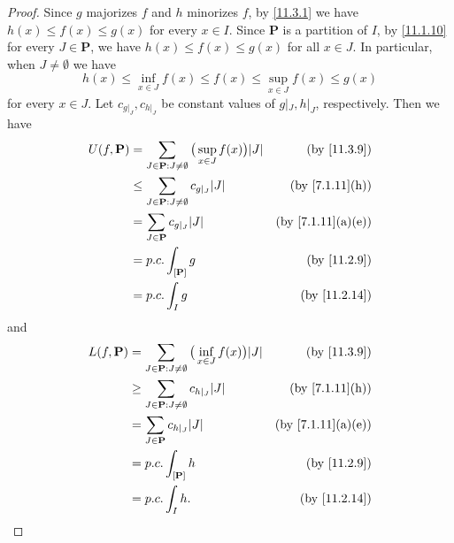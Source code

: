 \begin{proof}
  Since \(g\) majorizes \(f\) and \(h\) minorizes \(f\), by \cref{11.3.1} we have \(h(x) \leq f(x) \leq g(x)\) for every \(x \in I\).
  Since \(\mathbf{P}\) is a partition of \(I\), by \cref{11.1.10} for every \(J \in \mathbf{P}\), we have \(h(x) \leq f(x) \leq g(x)\) for all \(x \in J\).
  In particular, when \(J \neq \emptyset\) we have
  \[
    h(x) \leq \inf_{x \in J} f(x) \leq f(x) \leq \sup_{x \in J} f(x) \leq g(x)
  \]
  for every \(x \in J\).
  Let \(c_{g|_J}, c_{h|_J}\) be constant values of \(g|_J, h|_J\), respectively.
  Then we have
  \begin{align*}
    U(f, \mathbf{P}) & = \sum_{J \in \mathbf{P} : J \neq \emptyset} \big(\sup_{x \in J} f(x)\big) \abs{J} & \text{(by \cref{11.3.9})}       \\
                     & \leq \sum_{J \in \mathbf{P} : J \neq \emptyset} c_{g|_J} \abs{J}                   & \text{(by \cref{7.1.11}(h))}    \\
                     & = \sum_{J \in \mathbf{P}} c_{g|_J} \abs{J}                                         & \text{(by \cref{7.1.11}(a)(e))} \\
                     & = p.c. \int_{[\mathbf{P}]} g                                                       & \text{(by \cref{11.2.9})}       \\
                     & = p.c. \int_I g                                                                    & \text{(by \cref{11.2.14})}
  \end{align*}
  and
  \begin{align*}
    L(f, \mathbf{P}) & = \sum_{J \in \mathbf{P} : J \neq \emptyset} \big(\inf_{x \in J} f(x)\big) \abs{J} & \text{(by \cref{11.3.9})}       \\
                     & \geq \sum_{J \in \mathbf{P} : J \neq \emptyset} c_{h|_J} \abs{J}                   & \text{(by \cref{7.1.11}(h))}    \\
                     & = \sum_{J \in \mathbf{P}} c_{h|_J} \abs{J}                                         & \text{(by \cref{7.1.11}(a)(e))} \\
                     & = p.c. \int_{[\mathbf{P}]} h                                                       & \text{(by \cref{11.2.9})}       \\
                     & = p.c. \int_I h.                                                                   & \text{(by \cref{11.2.14})}
  \end{align*}
\end{proof}

